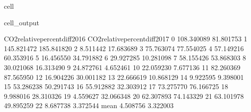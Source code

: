 \documentclass[letterpaper,10pt,english]{jupyterBook}
\begin{document}
\begin{sphinxuseclass}{cell}
\begin{sphinxVerbatimOutput}
\begin{sphinxuseclass}{cell_output}
\begin{sphinxVerbatim}[commandchars=\\\{\}]
      CO2\PYGZus{}relative\PYGZus{}percent\PYGZus{}diff\PYGZus{}2016  CO2\PYGZus{}relative\PYGZus{}percent\PYGZus{}diff\PYGZus{}2017  \PYGZbs{}
0                        \PYGZhy{}108.340089                      \PYGZhy{}81.801753   
1                        \PYGZhy{}145.821472                     \PYGZhy{}185.841820   
2                          \PYGZhy{}8.511442                      \PYGZhy{}17.683689   
3                          75.763074                       77.554025   
4                          57.149216                       60.353916   
5                         \PYGZhy{}16.456550                      \PYGZhy{}34.791882   
6                          29.927285                      \PYGZhy{}10.281098   
7                          58.155426                       53.868303   
8                          30.021068                       16.313490   
9                         \PYGZhy{}24.872761                        4.652461   
10                         22.059230                        7.677136   
11                         82.260369                       87.565950   
12                         16.904226                       30.001182   
13                        \PYGZhy{}22.666619                      \PYGZhy{}10.868129   
14                          9.922595                        9.398001   
15                         53.286238                       50.291743   
16                        \PYGZhy{}55.912882                      \PYGZhy{}32.303912   
17                         73.275770                       76.166725   
18                         \PYGZhy{}9.988016                      \PYGZhy{}28.310326   
19                         \PYGZhy{}4.559627                       32.066348   
20                        \PYGZhy{}62.307893                      \PYGZhy{}74.143329   
21                         63.101978                       49.895259   
22                         \PYGZhy{}8.687738                       \PYGZhy{}3.372544   
mean                        4.508756                        3.322003   


\end{sphinxVerbatim}
\end{sphinxuseclass}
\end{sphinxVerbatimOutput}
\end{sphinxuseclass}
\end{document}

